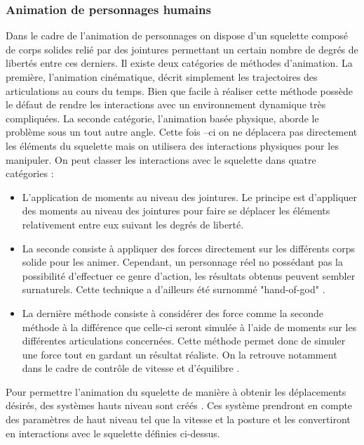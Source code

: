 \documentclass{llncs}
\begin{document}
\subsubsection{Animation de personnages humains} 
Dans le cadre de l'animation de personnages on dispose d'un squelette composé de corps solides relié par des jointures permettant un certain nombre de degrés de libertés entre ces derniers. Il existe deux catégories de méthodes d'animation. La première, l'animation cinématique, décrit simplement les trajectoires des articulations au cours du temps. Bien que facile à réaliser cette méthode possède le défaut de rendre les interactions avec un environnement dynamique très compliquées. La seconde catégorie, l'animation basée physique, aborde le problème sous un tout autre angle. Cette fois –ci on ne déplacera pas directement les éléments du squelette mais on utilisera des interactions physiques pour les manipuler. On peut classer les interactions avec le squelette dans quatre catégories \cite{geijtenbeek2012interactive}: \newline
\begin{itemize}
\item{L'application de moments au niveau des jointures. Le principe est d'appliquer des moments au niveau des jointures pour faire se déplacer les éléments relativement entre eux suivant les degrés de liberté.}
\item{La seconde consiste à appliquer des forces directement sur les différents corps solide pour les animer. Cependant, un personnage réel no possédant pas la possibilité d'effectuer ce genre d'action, les résultats obtenus peuvent sembler surnaturels. Cette technique a d'ailleurs été surnommé "hand-of-god" \cite{van1995guided}. }
\item{La dernière méthode consiste à considérer des force comme la seconde méthode à la différence que celle-ci seront simulée à l'aide de moments sur les différentes articulations concernées. Cette méthode permet donc de simuler une force tout en gardant un résultat réaliste. On la retrouve notamment dans le cadre de contrôle de vitesse et d'équilibre \cite{coros2010generalized}.}
\end{itemize}

Pour permettre l'animation du squelette de manière à obtenir les déplacements désirés, des systèmes hauts niveau sont créés \cite{geijtenbeek2012interactive}. Ces système prendront en compte des paramètres de haut niveau tel que la vitesse et la posture et les convertiront en interactions avec le squelette définies ci-dessus. 
\end{document}
